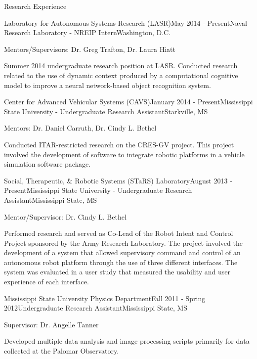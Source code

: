 \documentclass{resume} %
\begin{document}
\begin{rSection}{Research Experience}

	\begin{rSubsection}{Laboratory for Autonomous Systems Research (LASR)}{May 2014 - Present}{Naval Research Laboratory - NREIP Intern}{Washington, D.C.}
	\item Mentors/Supervisors: Dr. Greg Trafton, Dr. Laura Hiatt
	\item Summer 2014 undergraduate research position at LASR.  Conducted research related to the use of dynamic context produced by a computational cognitive model to improve a neural network-based object recognition system.  
	\end{rSubsection}


	\begin{rSubsection}{Center for Advanced Vehicular Systems (CAVS)}{January 2014 - Present}{Mississippi State University - Undergraduate Research Assistant}{Starkville, MS}
	\item Mentors: Dr. Daniel Carruth, Dr. Cindy L. Bethel
	\item Conducted ITAR-restricted research on the CRES-GV project.  This project involved the development of software to integrate robotic platforms in a vehicle simulation software package.
	\end{rSubsection}


	\begin{rSubsection}{Social, Therapeutic, \& Robotic Systems (STaRS) Laboratory}{August 2013 - Present}{Mississippi State University - Undergraduate Research Assistant}{Mississippi State, MS}
	\item Mentor/Supervisor: Dr. Cindy L. Bethel
	\item Performed research and served as Co-Lead of the Robot Intent and Control Project sponsored by the Army Research Laboratory.  The project involved the development of a system that allowed supervisory command and control of an autonomous robot platform through the use of three different interfaces.  The system was evaluated in a user study that measured the usability and user experience of each interface.
	\end{rSubsection}

	
	\begin{rSubsection}{Mississippi State University Physics Department}{Fall 2011 - Spring 2012}{Undergraduate Research Assistant}{Mississippi State, MS}
	\item Supervisor: Dr. Angelle Tanner
	\item Developed multiple data analysis and image processing scripts primarily for data collected at the Palomar Observatory.
	\end{rSubsection}

\end{rSection}
\end{document}
